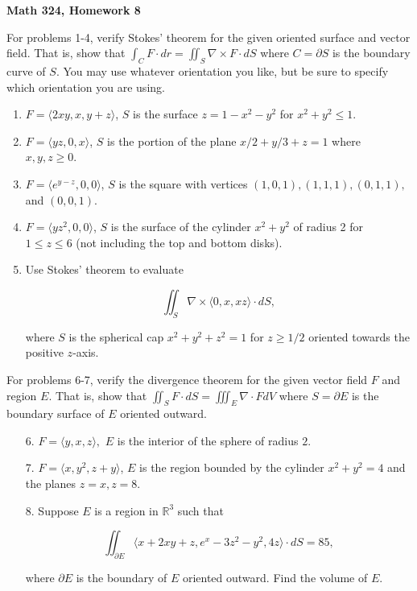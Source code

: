 \documentclass[11 pt]{report}
\begin{document}
\centerline{\bf Math 324, Homework 8}


\vspace{.2cm}

\noindent For problems 1-4, verify Stokes' theorem for the given oriented surface and vector field. That is, show that $\int_C F \cdot dr = \iint_S \nabla \times F \cdot dS$ where $C = \partial S$ is the boundary curve of $S$. You may use whatever orientation you like, but be sure to specify which orientation you are using. 

\begin{enumerate} \item $F = \langle 2xy, x, y+z \rangle$, $S$ is the surface $z = 1-x^2-y^2$ for $x^2 + y^2 \leq 1$. 

\item $F = \langle yz, 0, x \rangle$, $S$ is the portion of the plane $x/2 + y/3 + z = 1$ where $x, y ,z \geq 0$. 

\item $F = \langle e^{y-z}, 0, 0\rangle$, $S$ is the square with vertices $(1,0,1), (1,1,1), (0,1,1),$ and $(0,0,1)$. 

\item $F = \langle yz^2, 0,0 \rangle$, $S$ is the surface of the cylinder $x^2 + y^2$ of radius 2 for $1 \leq z \leq 6$ (not including the top and bottom disks). 

\item Use Stokes' theorem to evaluate 

$$\iint_S \nabla \times \langle 0, x, xz \rangle \cdot dS,$$

\vspace{5pt} \noindent where $S$ is the spherical cap $x^2+y^2+z^2 = 1$ for $z \geq 1/2$ oriented towards the positive $z$-axis. 

\end{enumerate}

\noindent For problems 6-7, verify the divergence theorem for the given vector field $F$ and region $E$. That is, show that $\iint_S F \cdot dS = \iiint_E \nabla \cdot F dV$ where $S = \partial E$ is the boundary surface of $E$ oriented outward. 

\begin{enumerate} \item[6.] $F = \langle y, x, z \rangle,$ $E$ is the interior of the sphere of radius $2$. 

\item[7.] $F = \langle x, y^2, z + y \rangle$, $E$ is the region bounded by the cylinder $x^2+y^2 = 4$ and the planes $z = x, z = 8$. 

\item[8.] Suppose $E$ is a region in $\mathbb{R}^3$ such that 

$$\iint_{\partial E} \langle x + 2xy + z, e^x - 3z^2 - y^2, 4z \rangle \cdot dS = 85,$$

where $\partial E$ is the boundary of $E$ oriented outward. Find the volume of $E$. 

\end{enumerate}
\end{document}
